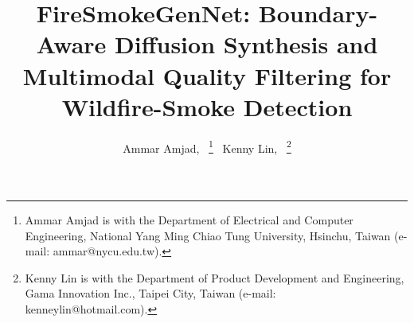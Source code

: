 \documentclass[journal]{IEEEtran}
\begin{document}
%
\title{FireSmokeGenNet: Boundary-Aware Diffusion Synthesis and Multimodal Quality Filtering for Wildfire-Smoke Detection}
%
%
%

\author{Ammar Amjad,~%
\thanks{Ammar Amjad is with the Department of Electrical and Computer Engineering, National Yang Ming Chiao Tung University, Hsinchu, Taiwan (e-mail: ammar@nycu.edu.tw).}%
~Kenny Lin,~%
\thanks{Kenny Lin is with the Department of Product Development and Engineering, Gama Innovation Inc., Taipei City, Taiwan (e-mail: kenneylin@hotmail.com).}}


\end{document}
